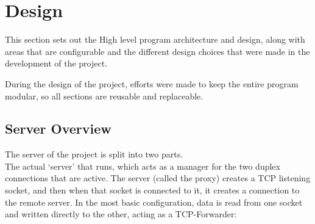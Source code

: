 \section{Design}
This section sets out the High level program architecture and design, along with areas that are configurable and the different design choices that were made in the development of the project.

During the design of the project, efforts were made to keep the entire program modular, so all sections are reusable and replaceable.

\subsection{Server Overview}
The server of the project is split into two parts.\\
The actual `server' that runs, which acts as a manager for the two duplex connections that are active. The server (called the proxy) creates a TCP listening socket, and then when that socket is connected to it, it creates a connection to the remote server.
In the most basic configuration, data is read from one socket and written directly to the other, acting as a TCP-Forwarder:
\begin{center}
\end{center}

